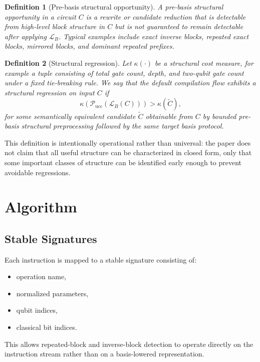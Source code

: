 \documentclass[11pt]{article}
\newtheorem{definition}{Definition}
\begin{document}
\begin{definition}[Pre-basis structural opportunity]
A \emph{pre-basis structural opportunity} in a circuit $C$ is a rewrite or candidate reduction that is detectable from high-level block structure in $C$ but is not guaranteed to remain detectable after applying $\mathcal{L}_B$. Typical examples include exact inverse blocks, repeated exact blocks, mirrored blocks, and dominant repeated prefixes.
\end{definition}

\begin{definition}[Structural regression]
Let $\kappa(\cdot)$ be a structural cost measure, for example a tuple consisting of total gate count, depth, and two-qubit gate count under a fixed tie-breaking rule. We say that the default compilation flow exhibits a \emph{structural regression} on input $C$ if
\[
\kappa\!\left(\mathcal{P}_{\mathrm{ucc}}(\mathcal{L}_B(C))\right)
>
\kappa(\widetilde{C}),
\]
for some semantically equivalent candidate $\widetilde{C}$ obtainable from $C$ by bounded pre-basis structural preprocessing followed by the same target basis protocol.
\end{definition}

This definition is intentionally operational rather than universal: the paper does not claim that all useful structure can be characterized in closed form, only that some important classes of structure can be identified early enough to prevent avoidable regressions.

\section{Algorithm}

\subsection{Stable Signatures}

Each instruction is mapped to a stable signature consisting of:
\begin{itemize}[leftmargin=1.5em]
    \item operation name,
    \item normalized parameters,
    \item qubit indices,
    \item classical bit indices.
\end{itemize}
This allows repeated-block and inverse-block detection to operate directly on the instruction stream rather than on a basis-lowered representation.
\end{document}
